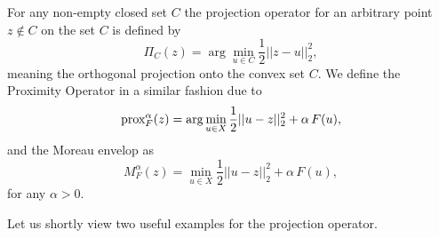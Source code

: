    \begin{definition} %
    \label{def:projection_operator}

        For any non-empty closed set $C$ the projection operator for an arbitrary point $z \notin C$ on the set $C$ is defined by
            \begin{equation}
                \Pi_{C}(z) = \arg \min_{u \in C} \frac{1}{2} ||z - u||_{2}^{2},
                \label{eq:projection_operator}
            \end{equation}
        meaning the orthogonal projection onto the convex set $C$. We define the Proximity Operator in a similar fashion due to
            \begin{equation}
                \textnormal{prox}^{\alpha}_{F}(z) = \arg \min_{u \in X} \frac{1}{2} ||u - z||_{2}^{2} + \alpha \, F(u),
                \label{eq:proximity_operator}
            \end{equation}
        and the Moreau envelop as
            \begin{equation}
                M^{\alpha}_{F}(z) = \min_{u \in X} \frac{1}{2} ||u - z||_{2}^{2} + \alpha \, F(u),
                \label{eq:envelop_operator}
            \end{equation}
        for any $\alpha > 0$.
    \end{definition}

    Let us shortly view two useful examples for the projection operator.

